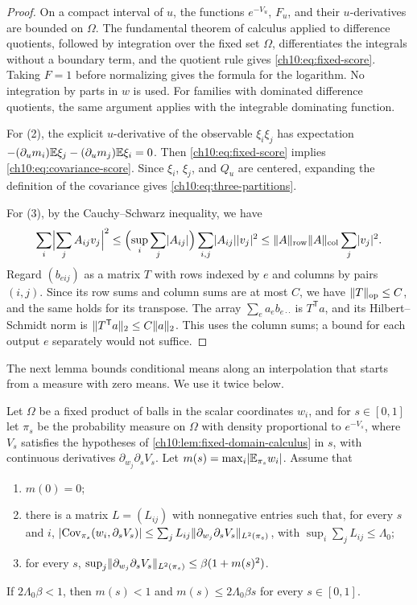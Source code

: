 \begin{proof}
On a compact interval of $u$, the functions $e^{-V_u}$, $F_u$, and their $u$-derivatives are bounded on $\Omega$. The fundamental theorem of calculus applied to difference quotients, followed by integration over the fixed set $\Omega$, differentiates the integrals without a boundary term, and the quotient rule gives \eqref{ch10:eq:fixed-score}. Taking $F=1$ before normalizing gives the formula for the logarithm. No integration by parts in $w$ is used. For families with dominated difference quotients, the same argument applies with the integrable dominating function.

For (2), the explicit $u$-derivative of the observable $\xi_i\xi_j$ has expectation $-(\partial_um_i)\mathbb E\xi_j-(\partial_um_j)\mathbb E\xi_i=0$. Then \eqref{ch10:eq:fixed-score} implies \eqref{ch10:eq:covariance-score}. Since $\xi_i$, $\xi_j$, and $Q_u$ are centered, expanding the definition of the covariance gives \eqref{ch10:eq:three-partitions}.

For (3), by the Cauchy--Schwarz inequality, we have
\[
 \sum_i\Bigl\lvert\sum_jA_{ij}v_j\Bigr\rvert^2\le\Bigl(\sup_i\sum_j\lvert A_{ij}\rvert\Bigr)\sum_{i,j}\lvert A_{ij}\rvert\lvert v_j\rvert^2\le\lVert A\rVert_{\mathrm{row}}\lVert A\rVert_{\mathrm{col}}\sum_j\lvert v_j\rvert^2.
\]
Regard $(b_{eij})$ as a matrix $T$ with rows indexed by $e$ and columns by pairs $(i,j)$. Since its row sums and column sums are at most $C$, we have $\lVert T\rVert_{\mathrm{op}}\le C$, and the same holds for its transpose. The array $\sum_ea_eb_{e\cdot\cdot}$ is $T^{\mathsf T}a$, and its Hilbert--Schmidt norm is $\lVert T^{\mathsf T}a\rVert_2\le C\lVert a\rVert_2$. This uses the column sums; a bound for each output $e$ separately would not suffice.
\end{proof}

The next lemma bounds conditional means along an interpolation that starts from a measure with zero means. We use it twice below.

\begin{lemma}\label{ch10:lem:mean-interpolation}
Let $\Omega$ be a fixed product of balls in the scalar coordinates $w_i$, and for $s\in[0,1]$ let $\pi_s$ be the probability measure on $\Omega$ with density proportional to $e^{-V_s}$, where $V_s$ satisfies the hypotheses of \cref{ch10:lem:fixed-domain-calculus} in $s$, with continuous derivatives $\partial_{w_j}\partial_sV_s$. Let $m(s)=\max_i\lvert \mathbb E_{\pi_s}w_i\rvert$. Assume that
\begin{enumerate}
\item $m(0)=0$;
\item there is a matrix $L=(L_{ij})$ with nonnegative entries such that, for every $s$ and $i$, $\lvert \operatorname{Cov}_{\pi_s}(w_i,\partial_sV_s)\rvert\le\sum_jL_{ij}\lVert \partial_{w_j}\partial_sV_s\rVert_{L^2(\pi_s)}$, with $\sup_i\sum_jL_{ij}\le\Lambda_0$;
\item for every $s$, $\sup_j\lVert \partial_{w_j}\partial_sV_s\rVert_{L^2(\pi_s)}\le\beta(1+m(s)^2)$.
\end{enumerate}
If $2\Lambda_0\beta<1$, then $m(s)<1$ and $m(s)\le2\Lambda_0\beta s$ for every $s\in[0,1]$.
\end{lemma}

